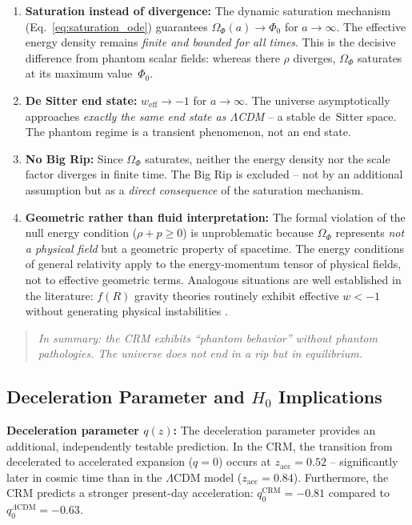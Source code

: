 \documentclass[aps,prd,twocolumn,superscriptaddress,nofootinbib]{revtex4-2}
\begin{document}
\begin{enumerate}
\item \textbf{Saturation instead of divergence:} The dynamic saturation mechanism (Eq.~\ref{eq:saturation_ode}) guarantees $\Omega_\Phi(a) \to \Phi_0$ for $a \to \infty$. The effective energy density remains \textit{finite and bounded for all times}. This is the decisive difference from phantom scalar fields: whereas there $\rho$ diverges, $\Omega_\Phi$ saturates at its maximum value~$\Phi_0$.
\item \textbf{De Sitter end state:} $w_{\mathrm{eff}} \to -1$ for $a \to \infty$. The universe asymptotically approaches \textit{exactly the same end state as $\Lambda$CDM} -- a stable de~Sitter space. The phantom regime is a transient phenomenon, not an end state.
\item \textbf{No Big Rip:} Since $\Omega_\Phi$ saturates, neither the energy density nor the scale factor diverges in finite time. The Big Rip is excluded -- not by an additional assumption but as a \textit{direct consequence} of the saturation mechanism.
\item \textbf{Geometric rather than fluid interpretation:} The formal violation of the null energy condition ($\rho + p \geq 0$) is unproblematic because $\Omega_\Phi$ represents \textit{not a physical field} but a geometric property of spacetime. The energy conditions of general relativity apply to the energy-momentum tensor of physical fields, not to effective geometric terms. Analogous situations are well established in the literature: $f(R)$ gravity theories routinely exhibit effective $w < -1$ without generating physical instabilities \cite{Sotiriou2010}.
\end{enumerate}

\begin{quote}
\textit{In summary: the CRM exhibits ``phantom behavior'' without phantom pathologies. The universe does not end in a rip but in equilibrium.}
\end{quote}


\subsection{Deceleration Parameter and $H_0$ Implications}
\label{subsec:deceleration}

\textbf{Deceleration parameter $q(z)$:} The deceleration parameter provides an additional, independently testable prediction. In the CRM, the transition from decelerated to accelerated expansion ($q = 0$) occurs at $z_{\mathrm{acc}} = 0.52$ -- significantly later in cosmic time than in the $\Lambda$CDM model ($z_{\mathrm{acc}} = 0.84$). Furthermore, the CRM predicts a stronger present-day acceleration: $q_0^{\mathrm{CRM}} = -0.81$ compared to $q_0^{\Lambda\mathrm{CDM}} = -0.63$.
\end{document}
